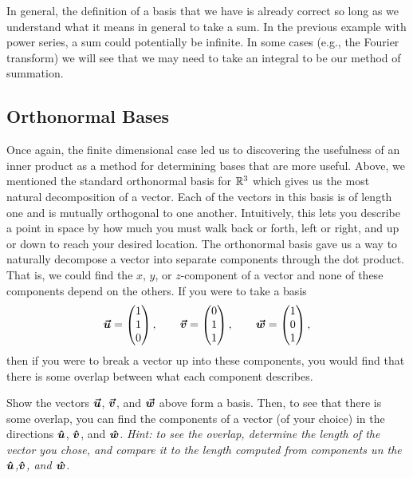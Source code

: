 In general, the definition of a basis that we have is already correct so long as we understand what it means in general to take a sum. In the previous example with power series, a sum could potentially be infinite.  In some cases (e.g., the Fourier transform) we will see that we may need to take an integral to be our method of summation.  

\subsection{Orthonormal Bases}

Once again, the finite dimensional case led us to discovering the usefulness of an inner product as a method for determining bases that are more useful.  Above, we mentioned the standard orthonormal basis for $\mathbb{R}^3$ which gives us the most natural decomposition of a vector.  Each of the vectors in this basis is of length one and is mutually orthogonal to one another.  Intuitively, this lets you describe a point in space by how much you must walk back or forth, left or right, and up or down to reach your desired location. The orthonormal basis gave us a way to naturally decompose a vector into separate components through the dot product. That is, we could find the $x$, $y$, or $z$-component of a vector and none of these components depend on the others. If you were to take a basis
\[
\boldsymbol{\boldsymbol{\vec{u}}} = \begin{pmatrix} 1 \\ 1 \\ 0 \end{pmatrix}, \qquad \boldsymbol{\boldsymbol{\vec{v}}} = \begin{pmatrix} 0 \\ 1 \\ 1 \end{pmatrix}, \qquad \boldsymbol{\boldsymbol{\vec{w}}} = \begin{pmatrix} 1 \\ 0 \\ 1 \end{pmatrix},
\]
then if you were to break a vector up into these components, you would find that there is some overlap between what each component describes.

\begin{exercise}
	Show the vectors $\boldsymbol{\boldsymbol{\vec{u}}}$, $\boldsymbol{\boldsymbol{\vec{v}}}$, and $\boldsymbol{\boldsymbol{\vec{w}}}$ above form a basis.  Then, to see that there is some overlap, you can find the components of a vector (of your choice) in the directions $\boldsymbol{\boldsymbol{\hat{u}}}$, $\boldsymbol{\boldsymbol{\hat{v}}}$, and $\boldsymbol{\boldsymbol{\hat{w}}}$. \emph{Hint: to see the overlap, determine the length of the vector you chose, and compare it to the length computed from components un the $\boldsymbol{\boldsymbol{\hat{u}}}$,$\boldsymbol{\boldsymbol{\hat{v}}}$, and $\boldsymbol{\boldsymbol{\hat{w}}}$.}
\end{exercise}

